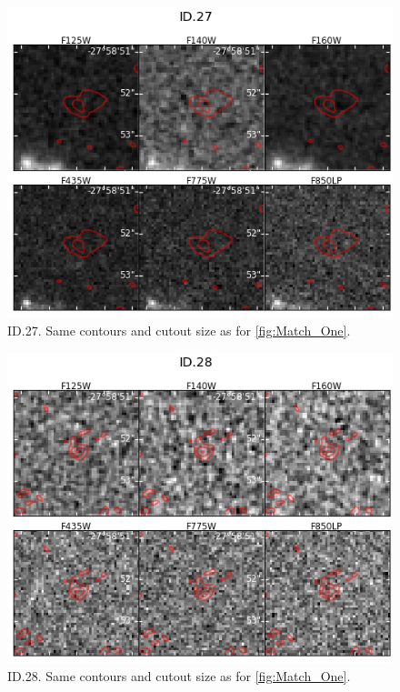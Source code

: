 \begin{figure}[tbp]
\centering \includegraphics[width=160mm]{Matched/ASPECS_Cutout_26.jpg}
\caption{ID.27. Same contours and cutout size as for \ref{fig:Match_One}.}
\label{fig:Match_Three}
\end{figure}

\begin{figure}[tbp]
\centering \includegraphics[width=160mm]{Matched/ASPECS_Cutout_27.jpg}
\caption{ID.28. Same contours and cutout size as for \ref{fig:Match_One}.}
\label{fig:Match_Three}
\end{figure}

